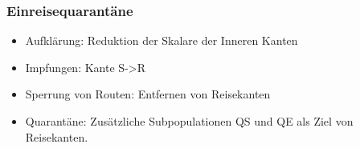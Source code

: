 \subsubsection{Einreisequarantäne}

\begin{itemize}
	\item Aufklärung: Reduktion der Skalare der Inneren Kanten
	\item Impfungen: Kante S->R
	\item Sperrung von Routen: Entfernen von Reisekanten
	\item Quarantäne: Zusätzliche Subpopulationen QS und QE als Ziel von Reisekanten. 
\end{itemize}

